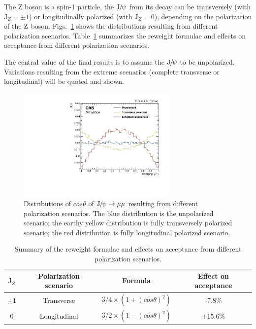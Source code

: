 		The Z boson is a spin-1 particle, the ${\mathrm{J}\hspace{-.08em}/\hspace{-.14em}\psi}$ from its decay can be transversely (with $\text{J}_{Z}=\pm 1$) or longitudinally polarized (with $\text{J}_{Z}=0$), depending on the polarization of the $\mathrm{Z}$ boson. 
		Figs.~\ref{fig:ZdecayJpsiPolarization} shows the distributions resulting from different polarization scenarios. 
		Table~\ref{tab:PolSce} summarizes the reweight formulae and effects on acceptance from different polarization scenarios.
		
		The central value of the final results is to assume the ${\mathrm{J}\hspace{-.08em}/\hspace{-.14em}\psi}$ to be unpolarized. Variations resulting from the extreme scenarios (complete transverse or longitudinal) will be quoted and shown.
		
		\begin{figure}[!ht]\begin{center}
		  \includegraphics[width=0.7\textwidth]{Fig/GenLevel_ZJpsiG/Polarization_Scenario}
		  \caption{Distributions of $cos\theta$ of ${\mathrm{J}\hspace{-.08em}/\hspace{-.14em}\psi}\to\mu\mu$ resulting from different polarization scenarios. The blue distribution is the unpolarized scenario; the earthy yellow distribution is fully transversely polarized scenario; the red distribution is fully longitudinal polarized scenario.}
		\label{fig:ZdecayJpsiPolarization}\end{center}\end{figure}
		
		\begin{table}[!ht]
		  \begin{center}
		    \begin{tabular}{|c|c|c|c|}
		    \hline
		      $\text{J}_{Z}$    & Polarization scenario   & Formula & Effect on acceptance \\ 
		      \hline
		      $\pm 1$   & Transverse   & $3/4\times(1+(cos\theta)^{2})$ & -7.8$\%$ \\
		      0   & Longitudinal   & $3/2\times(1-(cos\theta)^{2})$ & +15.6$\%$  \\
		      \hline
		    \end{tabular}
		    \caption{Summary of the reweight formulae and effects on acceptance from different polarization scenarios.\label{tab:PolSce}}
		  \end{center}
		\end{table}
		

